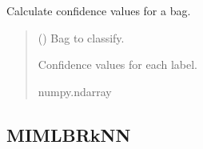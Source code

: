 \documentclass[letterpaper,10pt,english]{sphinxmanual}
\begin{document}
\begin{fulllineitems}
\begin{fulllineitems}
\label{\detokenize{classifier/lazy/index:miml.classifier.miml.lazy.miml_knn.MIMLkNN.predict_proba_bag}}
\pysigstartsignatures
\pysiglinewithargsret
{}
{}
{}
\pysigstopsignatures
\sphinxAtStartPar
Calculate confidence values for a bag.
\begin{quote}\begin{description}
\sphinxAtStartPar
{} ({\hyperref[\detokenize{data/_autosummary/miml.data.bag.Bag:miml.data.bag.Bag}]{}}) \textendash{} Bag to classify.

\sphinxAtStartPar
Confidence values for each label.

\sphinxAtStartPar
numpy.ndarray

\end{description}\end{quote}

\end{fulllineitems}


\end{fulllineitems}



\subsection{MIML\sphinxhyphen{}BR\sphinxhyphen{}kNN}
\label{\detokenize{classifier/lazy/index:miml-br-knn}}
\end{document}
